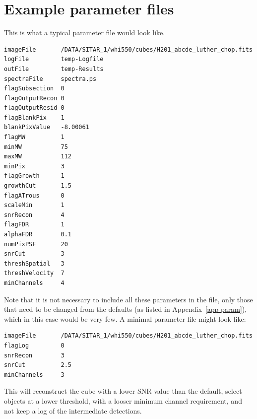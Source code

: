 \documentclass[12pt]{article}
\begin{document}
\newpage
\section{Example parameter files}
\label{app-input}

This is what a typical parameter file would look like.

\begin{verbatim}
imageFile       /DATA/SITAR_1/whi550/cubes/H201_abcde_luther_chop.fits
logFile         temp-Logfile
outFile         temp-Results
spectraFile     spectra.ps
flagSubsection  0
flagOutputRecon 0
flagOutputResid 0
flagBlankPix    1
blankPixValue   -8.00061
flagMW          1
minMW           75
maxMW           112
minPix          3
flagGrowth      1
growthCut       1.5
flagATrous      0
scaleMin        1
snrRecon        4
flagFDR         1
alphaFDR        0.1
numPixPSF       20
snrCut          3
threshSpatial   3
threshVelocity  7
minChannels     4
\end{verbatim}

Note that it is not necessary to include all these parameters in the
file, only those that need to be changed from the defaults (as listed
in Appendix~\ref{app-param}), which in this case would be very few. A
minimal parameter file might look like:
\begin{verbatim}
imageFile       /DATA/SITAR_1/whi550/cubes/H201_abcde_luther_chop.fits
flagLog         0
snrRecon        3
snrCut          2.5
minChannels     3
\end{verbatim}
This will reconstruct the cube with a lower SNR value than the
default, select objects at a lower threshold,  with a looser minimum
channel requirement, and not keep a log of the intermediate
detections. 
\end{document}
